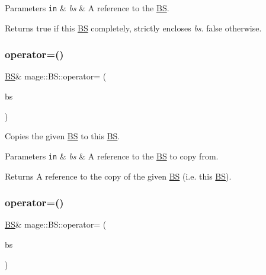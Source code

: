 \begin{DoxyParams}[1]{Parameters}
\mbox{\tt in}  & {\em bs} & A reference to the \hyperlink{structmage_1_1_b_s}{BS}. \\
\hline
\end{DoxyParams}
\begin{DoxyReturn}{Returns}
{\ttfamily true} if this \hyperlink{structmage_1_1_b_s}{BS} completely, strictly encloses {\itshape bs}. {\ttfamily false} otherwise. 
\end{DoxyReturn}
\hypertarget{structmage_1_1_b_s_aef60d898cb44bbf1e3988351b5717faa}{}\label{structmage_1_1_b_s_aef60d898cb44bbf1e3988351b5717faa} 
\subsubsection{\texorpdfstring{operator=()}{operator=()}\hspace{0.1cm}{\footnotesize\ttfamily [1/2]}}
{\footnotesize\ttfamily \hyperlink{structmage_1_1_b_s}{BS}\& mage\+::\+B\+S\+::operator= (\begin{DoxyParamCaption}\item[{const \hyperlink{structmage_1_1_b_s}{BS} \&}]{bs }\end{DoxyParamCaption})\hspace{0.3cm}{\ttfamily [default]}}

Copies the given \hyperlink{structmage_1_1_b_s}{BS} to this \hyperlink{structmage_1_1_b_s}{BS}.


\begin{DoxyParams}[1]{Parameters}
\mbox{\tt in}  & {\em bs} & A reference to the \hyperlink{structmage_1_1_b_s}{BS} to copy from. \\
\hline
\end{DoxyParams}
\begin{DoxyReturn}{Returns}
A reference to the copy of the given \hyperlink{structmage_1_1_b_s}{BS} (i.\+e. this \hyperlink{structmage_1_1_b_s}{BS}). 
\end{DoxyReturn}
\hypertarget{structmage_1_1_b_s_a751360f4d52fe40f6f07f29a759c9f0c}{}\label{structmage_1_1_b_s_a751360f4d52fe40f6f07f29a759c9f0c} 
\subsubsection{\texorpdfstring{operator=()}{operator=()}\hspace{0.1cm}{\footnotesize\ttfamily [2/2]}}
{\footnotesize\ttfamily \hyperlink{structmage_1_1_b_s}{BS}\& mage\+::\+B\+S\+::operator= (\begin{DoxyParamCaption}\item[{\hyperlink{structmage_1_1_b_s}{BS} \&\&}]{bs }\end{DoxyParamCaption})\hspace{0.3cm}{\ttfamily [default]}}

